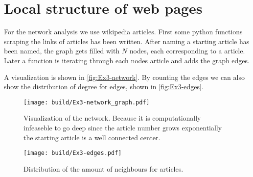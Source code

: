 \section{Local structure of web pages}
\label{sec:exercise-3}
For the network analysis we use wikipedia articles. First some python functions scraping the links of articles has been
written. After naming a starting article has been named, the graph gets filled with $N$ nodes, each corresponding to a
article. Later a function is iterating through each nodes article and adds the graph edges.

A visualization is shown in \autoref{fig:Ex3-network}. By counting the edges we can also show the distribution of degree
for edges, shown in \autoref{fig:Ex3-edges}.
\begin{figure}
	\centering
  \texttt{[image: build/Ex3-network\_graph.pdf]}
  \caption{Visualization of the network. Because it is computationally infeaseble to go deep since the article number
  grows exponentially the starting article is a well connected center.}
  \label{fig:Ex3-network}
\end{figure}
\begin{figure}
	\centering
  \texttt{[image: build/Ex3-edges.pdf]}
  \caption{Distribution of the amount of neighbours for articles.}
  \label{fig:Ex3-edges}
\end{figure}

